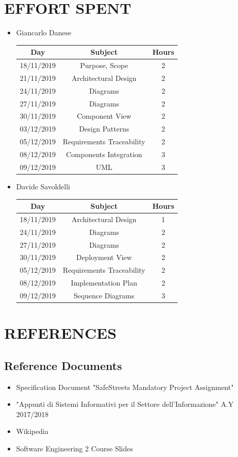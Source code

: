 \documentclass[12pt,a4paper]{article}
\begin{document}
\section{EFFORT SPENT}
\begin{itemize}
		\item Giancarlo Danese
		\begin{center}
			\begin{tabular}{| c | c | c |}
				\hline
				Day & Subject & Hours \\ \hline
				18/11/2019 & Purpose, Scope & 2 \\
				21/11/2019 & Architectural Design & 2\\
				24/11/2019 & Diagrams & 2\\
				27/11/2019 & Diagrams & 2\\
				30/11/2019 & Component View & 2\\
				03/12/2019 & Design Patterns & 2\\
				05/12/2019 & Requirements Traceability & 2\\
				08/12/2019 & Components Integration & 3\\
				09/12/2019 & UML & 3\\
				\hline
			\end{tabular}
		\end{center}

		\item Davide Savoldelli
		\begin{center}
			\begin{tabular}{| c | c | c |}
				\hline
				Day & Subject & Hours \\ \hline
				18/11/2019 & Architectural Design & 1 \\
				24/11/2019 & Diagrams & 2 \\
				27/11/2019 & Diagrams & 2 \\
				30/11/2019 & Deployment View & 2\\
				05/12/2019 & Requirements Traceability & 2\\
				08/12/2019 & Implementation Plan & 2\\
				09/12/2019 & Sequence Diagrams & 3\\
				\hline
			\end{tabular}
		\end{center}
	\end{itemize}
\section{REFERENCES}
\subsection{Reference Documents} 
\begin{itemize}
\item Specification Document "SafeStreets Mandatory Project Assignment"
\item "Appunti di Sistemi Informativi per il Settore dell'Informazione" A.Y 2017/2018
\item Wikipedia
\item Software Engineering 2 Course Slides
\end{itemize}
\end{document}
